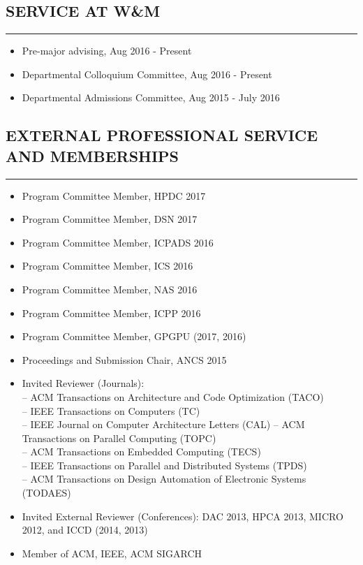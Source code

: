 \documentclass[10pt,a4]{article}
\begin{document}
\subsection*{SERVICE AT W\&M}
\hrule
\vspace{0.2cm}
\begin{itemize}
	\item Pre-major advising, Aug 2016 - Present
	\item Departmental Colloquium Committee, Aug 2016 - Present
	\item Departmental Admissions Committee, Aug 2015 - July 2016
\end{itemize}

\subsection*{EXTERNAL PROFESSIONAL SERVICE AND MEMBERSHIPS}
\hrule
\vspace{0.2cm}
\begin{itemize}
	\item Program Committee Member, HPDC 2017
	\item Program Committee Member, DSN 2017
	\item Program Committee Member, ICPADS 2016 
	\item Program Committee Member, ICS 2016
	\item Program Committee Member, NAS 2016
	\item Program Committee Member, ICPP 2016
	\item Program Committee Member, GPGPU (2017, 2016)
	\item Proceedings and Submission Chair, ANCS 2015
	\item Invited Reviewer (Journals):  \\
	-- ACM Transactions on Architecture and Code Optimization (TACO) \\
	-- IEEE Transactions on Computers (TC) \\ 
	-- IEEE Journal on Computer Architecture Letters (CAL)
	-- ACM Transactions on Parallel Computing (TOPC) \\
	-- ACM Transactions on Embedded Computing (TECS) \\
	-- IEEE Transactions on Parallel and Distributed Systems (TPDS) \\
	-- ACM Transactions on Design Automation of Electronic Systems (TODAES) \\
	\item Invited External Reviewer (Conferences):
	DAC 2013, HPCA 2013, MICRO 2012, and ICCD (2014, 2013)
	\item Member of ACM, IEEE, ACM SIGARCH
\end{itemize}
\end{document}
